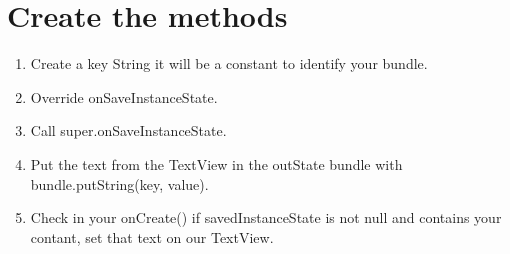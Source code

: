 \documentclass[12pt]{article} %
\begin{document}

\section{Create the methods}

\begin{enumerate}
	\item Create a key String it will be a constant to identify your bundle.
	\item Override onSaveInstanceState.
	\item Call super.onSaveInstanceState.
	\item Put the text from the TextView in the outState bundle with bundle.putString(key, value).
	\item Check in your onCreate() if  savedInstanceState is not null and contains your contant, set that text on our TextView.
\end{enumerate}
\end{document}
